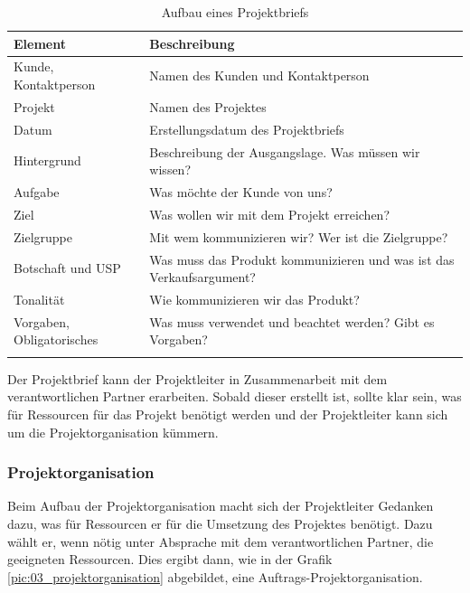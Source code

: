 \begin{longtable}{lp{10cm}}
    \toprule \textbf{Element} & \textbf{Beschreibung} \\
    \midrule Kunde, Kontaktperson &
        Namen des Kunden und Kontaktperson \\
    \midrule Projekt &
        Namen des Projektes \\
    \midrule Datum &
        Erstellungsdatum des Projektbriefs \\
    \midrule Hintergrund &
        Beschreibung der Ausgangslage. Was müssen wir wissen? \\
    \midrule Aufgabe &
        Was möchte der Kunde von uns? \\
    \midrule Ziel &
        Was wollen wir mit dem Projekt erreichen? \\
    \midrule Zielgruppe &
        Mit wem kommunizieren wir? Wer ist die Zielgruppe? \\
    \midrule Botschaft und USP &
        Was muss das Produkt kommunizieren und was ist das Verkaufsargument? \\
    \midrule Tonalität &
        Wie kommunizieren wir das Produkt? \\
    \midrule Vorgaben, Obligatorisches &
        Was muss verwendet und beachtet werden? Gibt es Vorgaben? \\
    \bottomrule
    \caption[Aufbau eines Projektbriefs]{Aufbau eines Projektbriefs\footnotemark}
    \label{tab:projektbrief}
\end{longtable}

Der Projektbrief kann der Projektleiter in Zusammenarbeit mit dem verantwortlichen 
Partner erarbeiten. Sobald dieser erstellt ist, sollte klar sein, was für 
Ressourcen für das Projekt benötigt werden und der Projektleiter kann sich um 
die Projektorganisation kümmern.

\subsubsection{Projektorganisation}
Beim Aufbau der Projektorganisation macht sich der Projektleiter Gedanken dazu,
was für Ressourcen er für die Umsetzung des Projektes benötigt. Dazu wählt er,
wenn nötig unter Absprache mit dem verantwortlichen Partner, die geeigneten 
Ressourcen. Dies ergibt dann, wie in der Grafik \ref{pic:03_projektorganisation} 
abgebildet, eine Auftrags-Projektorganisation.

